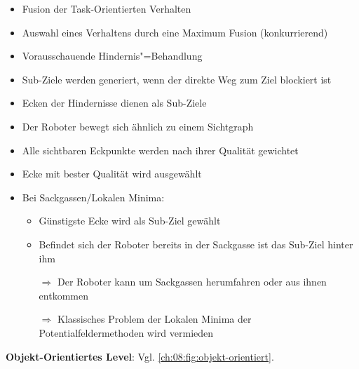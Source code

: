 \begin{itemize}
	\item Fusion der Task-Orientierten Verhalten
	\item Auswahl eines Verhaltens durch eine Maximum Fusion (konkurrierend)
	\item Vorausschauende Hindernis"=Behandlung
	\item Sub-Ziele werden generiert, wenn der direkte Weg zum Ziel blockiert ist
	\item Ecken der Hindernisse dienen als Sub-Ziele
	\item Der Roboter bewegt sich ähnlich zu einem Sichtgraph
	\item Alle sichtbaren Eckpunkte werden nach ihrer Qualität gewichtet
	\item Ecke mit bester Qualität wird ausgewählt
	\item Bei Sackgassen/Lokalen Minima:
	\begin{itemize}
		\item Günstigste Ecke wird als Sub-Ziel gewählt
		\item Befindet sich der Roboter bereits in der Sackgasse ist das Sub-Ziel hinter ihm
		\item[$\Rightarrow$] Der Roboter kann um Sackgassen herumfahren oder aus ihnen entkommen
		\item[$\Rightarrow$] Klassisches Problem der Lokalen Minima der Potentialfeldermethoden wird vermieden
	\end{itemize}
\end{itemize}
\noindent
\textbf{Objekt-Orientiertes Level}:
Vgl. \autoref{ch:08:fig:objekt-orientiert}.
